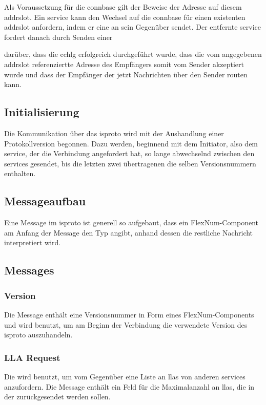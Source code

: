 Als Voraussetzung für die \gls{connbase}  gilt der Beweise der Adresse auf diesem
\gls{addrslot}. Ein \gls{service} kann den Wechsel auf die \gls{connbase}  für einen
existenten \gls{addrslot} anfordern, indem er eine \msg{\isprotots} an sein Gegenüber sendet.
Der entfernte \gls{service} fordert danach durch Senden einer \msg{}

darüber, dass die \gls{cchlg} erfolgreich durchgeführt wurde, dass die
vom angegebenen \gls{addrslot} referenziertte Adresse des Empfängers somit vom Sender akzeptiert
wurde und dass der Empfänger der \msg{\isprotocbn} jetzt Nachrichten über den Sender routen kann.

\subsection{Initialisierung}
Die Kommunikation über das \gls{isproto} wird mit der Aushandlung einer Protokollversion begonnen.
Dazu werden, beginnend mit dem Initiator, also dem \gls{service}, der die Verbindung angefordert hat,
so lange \msgpl{\isprotoversion} abwechselnd zwischen den \glspl{service} gesendet, bis die letzten
zwei übertragenen \msgpl{\isprotoversion} die selben Versionsnummern enthalten.

\subsection{Messageaufbau}
Eine Message im \gls{isproto} ist generell so aufgebaut, dass ein FlexNum-Component am Anfang der
Message den Typ angibt, anhand dessen die restliche Nachricht interpretiert wird.

\isprotobytefield

\subsection{Messages}

\subsubsection{Version}
\label{dcl-isproto-version}
Die \isprotoversion Message enthält eine Versionsnummer in Form eines FlexNum-Components und wird
benutzt, um am Beginn der Verbindung die verwendete Version des \gls{isproto} auszuhandeln.

\isprotoversionbytefield

\subsubsection{LLA Request}
\label{dcl-isproto-llareq}
Die \msg{\isprotollareq} wird benutzt, um vom Gegenüber eine Liste an \glspl{lla} von anderen
\glspl{service} anzufordern.
Die Message enthält ein Feld für die Maximalanzahl an \glspl{lla}, die in der
\msg{\isprotollarep} zurückgesendet werden sollen.

